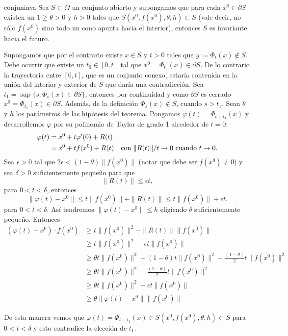 \begin{teorema}{conjuninva} Sea $S\subset\Omega$ un conjunto abierto y supongamos
que para cada $x^0\in\partial S$ existen un $1\geq\theta>0$ y
$h>0$ tales que   $S(x^0,f(x^0),\theta,h)\subset S$ (vale decir,
no sólo $f(x^0)$ sino todo un cono apunta hacia el interior),
entonces $S$ es invariante hacia el futuro.
\end{teorema}
\begin{demo} Supongamos que por el contrario existe $x\in S$ y $t>0$ tales que
 $y:=\Phi_t(x)\notin S$. Debe ocurrir que existe un $t_0\in[0,t]$
 tal que $x^0=\Phi_{t_0}(x)\in\partial S$. De lo contrario la
 trayectoria entre $[0,t]$, que es un conjunto conexo, estaría contenida
 en la unión del interior y exterior de $S$ que daría una
 contradicción. Sea $t_1=\sup\{s:\Phi_s(x)\in\partial S\}$,
 entonces por continuidad y como $\partial S$ es cerrado
 $x^0=\Phi_{t_1}(x)\in\partial S$. Además, de la definición
 $\Phi_s(x)\notin S$, cuando $s>t_1$. Sean $\theta$ y $h$
 los parámetros de las hipótesis del teorema. Pongamos $\varphi(t)=\Phi_{t+t_1}(x)$ y
 desarrollemos $\varphi$ por su polinomio de Taylor de grado 1 alrededor de $t=0$:
 \begin{equation}\label{taylorlinea}
   \begin{split}
    \varphi(t)&=x^0+t\varphi'(0)+R(t)\\
    &=x^0+tf(x^0)+R(t)\quad\hbox{con }\|R(t)\|/t\to 0\hbox{ cuando
    }t\to 0.
   \end{split}
 \end{equation}
Sea $\epsilon>0$ tal que $2\epsilon<(1-\theta)\|f(x^0)\|$ (notar
que debe ser $f(x^0)\neq 0$) y sea $\delta>0$ suficientemente
pequeño para que
\[
\|R(t)\|\leq \epsilon t, \]
 para $0<t<\delta$, entonces
\[
    \|\varphi(t)-x^0\|\leq t\|f(x^0)\|+\|R(t)\|\leq
    t\|f(x^0)\|+\epsilon t.
\]
para $0<t<\delta $. Así tendremos $\|\varphi(t)-x^0\|\leq h$ eligiendo
$\delta$ suficientemente pequeño. Entonces
\[
    \begin{split}
    (\varphi(t)-x^0)\cdot f(x^0)&\geq t\|f(x^0)\|^2-\|R(t)\| \|f(x^0)\|\\
    &\geq t\|f(x^0)\|^2-\epsilon t \|f(x^0)\|\\
    &\geq\theta t\|f(x^0)\|^2+ (1-\theta)t\|f(x^0)\|^2-\frac{(1-\theta)}{2} t\|f(x^0)\|^2\\
    &\geq\theta t\|f(x^0)\|^2+
    \frac{(1-\theta)}{2}t\|f(x^0)\|^2\\
     &\geq\theta t\|f(x^0)\|^2+
    \epsilon t\|f(x^0)\|\\
    &\geq \theta\|\varphi(t)-x^0\|\|f(x^0)\|
    \end{split}
\]

De esta manera vemos que $\varphi(t)=\Phi_{t+t_1}(x)\in
S(x^0,f(x^0),\theta,h)\subset S$ para $0<t<\delta$ y esto
contradice la elección de $t_1$. \end{demo}


